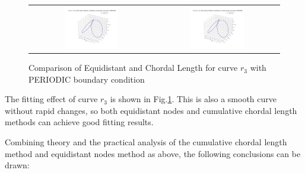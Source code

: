 \documentclass[a4paper]{article}
\begin{document}
\begin{sloppypar}
\begin{figure}[H]
\begin{tabular}{cc}
    \includegraphics[width=0.45\textwidth]{../figure/problemE/N_160_r3_BSpline_Equidistant_PERIODIC_3D.png} &
    \includegraphics[width=0.45\textwidth]{../figure/problemE/N_160_r3_BSpline_ChordalLength_PERIODIC_3D.png} \\
  \end{tabular}
  \renewcommand{\figurename}{Fig.}
  \caption{Comparison of Equidistant and Chordal Length for curve \(r_3\) with PERIODIC boundary condition}
  \label{fig:r3_nodeType_compare}
\end{figure}

The fitting effect of curve \(r_3\) is shown in
Fig.\ref{fig:r3_nodeType_compare}. This is also a smooth curve without rapid
changes, so both equidistant nodes and cumulative chordal length methods can
achieve good fitting results.

Combining theory and the practical analysis of the cumulative chordal length
method and equidistant nodes method as above, the following conclusions can be
drawn:


\end{sloppypar}
\end{document}
